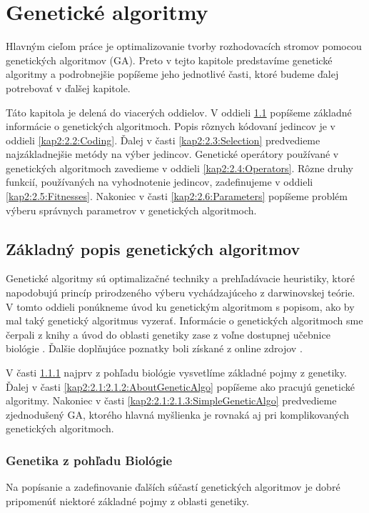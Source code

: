 \chapter{Genetické algoritmy}
Hlavným cieľom práce je optimalizovanie tvorby rozhodovacích stromov pomocou genetických algoritmov (GA). Preto 
v tejto kapitole predstavíme genetické algoritmy a podrobnejšie popíšeme jeho jednotlivé časti, ktoré budeme ďalej potrebovať v ďalšej kapitole.

Táto kapitola je delená do viacerých oddielov. V oddieli \ref{kap2:2.1:Info} popíšeme základné informácie o genetických algoritmoch. Popis rôznych kódovaní jedincov je v oddieli \ref{kap2:2.2:Coding}. Ďalej v časti \ref{kap2:2.3:Selection} predvedieme najzákladnejšie metódy na výber jedincov. Genetické operátory používané v genetických algoritmoch zavedieme v oddieli \ref{kap2:2.4:Operators}. Rôzne druhy funkcií, používaných na vyhodnotenie jedincov, zadefinujeme v oddieli \ref{kap2:2.5:Fitnesses}. Nakoniec v časti \ref{kap2:2.6:Parameters} popíšeme problém výberu správnych parametrov v genetických algoritmoch.

\section{Základný popis genetických algoritmov}\label{kap2:2.1:Info}
Genetické algoritmy sú optimalizačné techniky a prehľadávacie heuristiky, ktoré napodobujú princíp prirodzeného výberu vychádzajúceho z darwinovskej teórie. V tomto oddieli ponúkneme úvod ku genetickým algoritmom s popisom, ako by mal taký genetický algoritmus vyzerať. Informácie o genetických algoritmoch sme čerpali z knihy \cite{kap2-evolution} a úvod do oblasti genetiky zase z voľne dostupnej učebnice biológie \cite{online-biology}. Ďalšie doplňujúce poznatky boli získané z online zdrojov \cite{wiki-evolution,wiki-genetics}.

V časti \ref{kap2:2.1:2.1.1:Genetics} najprv z pohľadu biológie vysvetlíme základné pojmy z genetiky. Ďalej v časti \ref{kap2:2.1:2.1.2:AboutGeneticAlgo} popíšeme ako pracujú genetické algoritmy. Nakoniec v časti \ref{kap2:2.1:2.1.3:SimpleGeneticAlgo} predvedieme zjednodušený GA, ktorého hlavná myšlienka je rovnaká aj pri komplikovaných genetických algoritmoch.

\subsection{Genetika z pohľadu Biológie}\label{kap2:2.1:2.1.1:Genetics}
Na popísanie a zadefinovanie ďalších súčastí genetických algoritmov je dobré pripomenúť niektoré základné pojmy z oblasti genetiky. 

